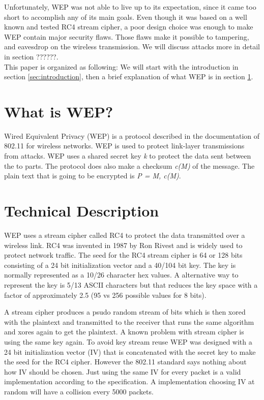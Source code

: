 \documentclass[twocolumn]{IEEEtran}
\begin{document}
Unfortunately, WEP was not able to live up to its expectation, since it came too short to
accomplish any of its main goals. Even though it was based on a well known and tested RC4 
stream cipher, a poor design choice was enough to make WEP contain major security flaws. Those
flaws make it possible to tampering, and eavesdrop on the wireless transmission. We will 
discuss attacks more in detail in section ??????. \\



This paper is organized as following: We will start with the introduction in 
section \ref{sec:introduction}, then a brief explanation of what WEP is in 
section \ref{sec:whatiswep}. 


\section {What is WEP?}
\label{sec:whatiswep}

Wired Equivalent Privacy (WEP) is a protocol described in the documentation of 802.11 for 
wireless networks. WEP is used to protect link-layer transmissions from attacks. WEP uses a 
shared secret key \emph{k} to protect the data sent between the to parts. The protocol does also
make a checksum \emph{c(M)} of the message. The plain text that is going to be encrypted is 
\emph{P = M, c(M)}. 



\section {Technical Description}
\label{sec:technical_description}

WEP uses a stream cipher called RC4 to protect the data transmitted over a wireless link. RC4 was invented in 1987 by Ron Rivest and is widely used to protect network traffic. The seed for the RC4 stream cipher is 64 or 128 bits consisting of a 24 bit initialization vector and a 40/104 bit key. The key is normally represented as a 10/26 character hex values. A alternative way to represent the key is 5/13 ASCII characters but that reduces the key space with a factor of approximately 2.5 (95 vs 256 possible values for 8 bits).

A stream cipher produces a psudo random stream of bits which is then xored with the plaintext and transmitted to the receiver that runs the same algorithm and xores again to get the plaintext. A known problem with stream cipher is using the same key again. To avoid key stream reuse WEP was designed with a 24 bit initialization vector (IV) that is concatenated with the secret key to make the seed for the RC4 cipher. However the 802.11 standard says nothing about how IV should be chosen. Just using the same IV for every packet is a valid implementation according to the specification. A implementation choosing IV at random will have a collision every 5000 packets. 
\end{document}
